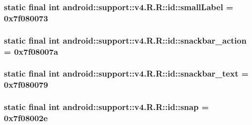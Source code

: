 \hypertarget{classandroid_1_1support_1_1v4_1_1_r_1_1id_9885e4f8e4fdd0d4e596243655f19c1f}{
\subsubsection[{smallLabel}]{\setlength{\rightskip}{0pt plus 5cm}static final int android::support::v4.R.R::id::smallLabel = 0x7f080073}}
\label{classandroid_1_1support_1_1v4_1_1_r_1_1id_9885e4f8e4fdd0d4e596243655f19c1f}


\hypertarget{classandroid_1_1support_1_1v4_1_1_r_1_1id_e5c2568956573c22af1b01cf38f7ee93}{
\subsubsection[{snackbar\_\-action}]{\setlength{\rightskip}{0pt plus 5cm}static final int android::support::v4.R.R::id::snackbar\_\-action = 0x7f08007a}}
\label{classandroid_1_1support_1_1v4_1_1_r_1_1id_e5c2568956573c22af1b01cf38f7ee93}


\hypertarget{classandroid_1_1support_1_1v4_1_1_r_1_1id_7e23c6368baf2699ebc4264ebb3c4c7a}{
\subsubsection[{snackbar\_\-text}]{\setlength{\rightskip}{0pt plus 5cm}static final int android::support::v4.R.R::id::snackbar\_\-text = 0x7f080079}}
\label{classandroid_1_1support_1_1v4_1_1_r_1_1id_7e23c6368baf2699ebc4264ebb3c4c7a}


\hypertarget{classandroid_1_1support_1_1v4_1_1_r_1_1id_b18cec24b0ebd0be44cda0030df9a843}{
\subsubsection[{snap}]{\setlength{\rightskip}{0pt plus 5cm}static final int android::support::v4.R.R::id::snap = 0x7f08002e}}
\label{classandroid_1_1support_1_1v4_1_1_r_1_1id_b18cec24b0ebd0be44cda0030df9a843}


